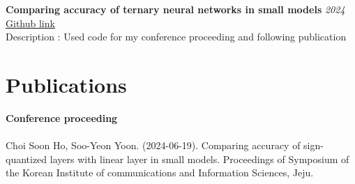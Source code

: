 \documentclass[11pt, a4paper]{article}
\newcommand{\itemheader}[2]{
    \noindent\textbf{#1} \hfill \textit{#2} \\
}
\begin{document}
\itemheader{Comparing accuracy of ternary neural networks in small models}{2024}
\href{https://github.com/Snow0821/Comparing_Accuracy_of_Ternary_Neural_Networks_in_Small_Models}{Github link}\\
Description : Used code for my conference proceeding and following publication\\

\section*{Publications}

\noindent
\itemheader{Conference proceeding} \\
\text{[1]} Choi Soon Ho, Soo-Yeon Yoon. (2024-06-19). Comparing accuracy of sign-quantized layers with linear layer in small models. Proceedings of Symposium of the Korean Institute of communications and Information Sciences, Jeju.\relax
\end{document}
